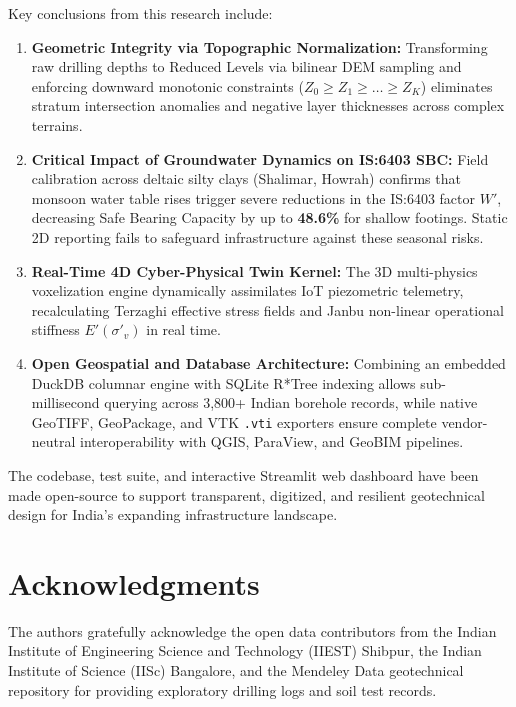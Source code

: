 \documentclass[11pt,a4paper]{article}
\begin{document}
Key conclusions from this research include:
\begin{enumerate}
    \item \textbf{Geometric Integrity via Topographic Normalization:} Transforming raw drilling depths to Reduced Levels via bilinear DEM sampling and enforcing downward monotonic constraints ($Z_0 \ge Z_1 \ge \dots \ge Z_K$) eliminates stratum intersection anomalies and negative layer thicknesses across complex terrains.
    \item \textbf{Critical Impact of Groundwater Dynamics on IS:6403 SBC:} Field calibration across deltaic silty clays (Shalimar, Howrah) confirms that monsoon water table rises trigger severe reductions in the IS:6403 factor $W'$, decreasing Safe Bearing Capacity by up to \textbf{48.6\%} for shallow footings. Static 2D reporting fails to safeguard infrastructure against these seasonal risks.
    \item \textbf{Real-Time 4D Cyber-Physical Twin Kernel:} The 3D multi-physics voxelization engine dynamically assimilates IoT piezometric telemetry, recalculating Terzaghi effective stress fields and Janbu non-linear operational stiffness $E'(\sigma'_v)$ in real time.
    \item \textbf{Open Geospatial and Database Architecture:} Combining an embedded DuckDB columnar engine with SQLite R*Tree indexing allows sub-millisecond querying across 3,800+ Indian borehole records, while native GeoTIFF, GeoPackage, and VTK \texttt{.vti} exporters ensure complete vendor-neutral interoperability with QGIS, ParaView, and GeoBIM pipelines.
\end{enumerate}

The codebase, test suite, and interactive Streamlit web dashboard have been made open-source to support transparent, digitized, and resilient geotechnical design for India's expanding infrastructure landscape.

\section*{Acknowledgments}
The authors gratefully acknowledge the open data contributors from the Indian Institute of Engineering Science and Technology (IIEST) Shibpur, the Indian Institute of Science (IISc) Bangalore, and the Mendeley Data geotechnical repository for providing exploratory drilling logs and soil test records.



\end{document}
